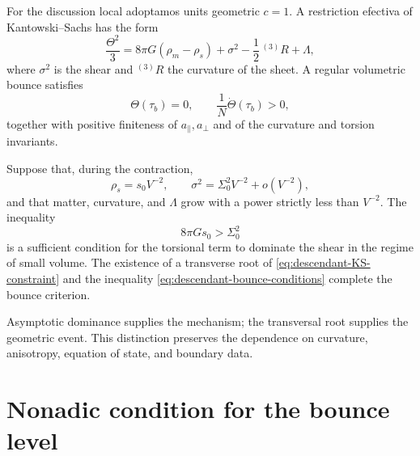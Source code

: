 For the discussion local adoptamos units geometric \(c=1\). A
restriction efectiva of Kantowski--Sachs has the form
\begin{equation}
 \frac{\Theta^2}{3}
 =8\pi G(\rho_m-\rho_s)
 +\sigma^2-\frac12\,{}^{(3)}R+\Lambda,
 \label{eq:descendant-KS-constraint}
\end{equation}
where \(\sigma^2\) is the shear and \({}^{(3)}R\) the curvature of the sheet.
A regular volumetric bounce satisfies
\begin{equation}
 \boxed{
 \Theta(\tau_b)=0,
 \qquad
 \frac1N\dot\Theta(\tau_b)>0,}
 \label{eq:descendant-bounce-conditions}
\end{equation}
together with positive finiteness of \(a_\parallel,a_\perp\) and of the curvature
and torsion invariants.

\begin{criterion}
\label{crit:descendant-torsion-dominance}
Suppose that, during the contraction,
\begin{equation}
 \rho_s=s_0V^{-2},
 \qquad
 \sigma^2=\Sigma_0^2V^{-2}+o(V^{-2}),
 \label{eq:descendant-torsion-shear-scaling}
\end{equation}
and that matter, curvature, and \(\Lambda\) grow with a power strictly
less than \(V^{-2}\). The inequality
\begin{equation}
 \boxed{8\pi Gs_0>\Sigma_0^2}
 \label{eq:descendant-torsion-dominates-shear}
\end{equation}
is a sufficient condition for the torsional term to dominate the
shear in the regime of small volume. The existence of a transverse root
of \cref{eq:descendant-KS-constraint} and the inequality
\cref{eq:descendant-bounce-conditions} complete the bounce criterion.
\end{criterion}

Asymptotic dominance supplies the mechanism; the transversal root supplies
the geometric event. This distinction preserves the dependence on
curvature, anisotropy, equation of state, and boundary data.

\section{Nonadic condition for the bounce level}

